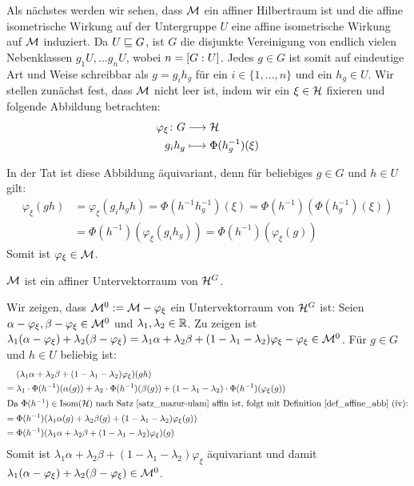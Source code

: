 Als nächstes werden wir sehen, dass $\mathcal{M}$ ein affiner Hilbertraum ist und die affine isometrische Wirkung auf der Untergruppe $U$ eine affine isometrische Wirkung auf $\mathcal{M}$ induziert. Da $U \sqsubseteq G$, ist $G$ die disjunkte Vereinigung von endlich vielen Nebenklassen $g_1U, \dots g_nU$, wobei $n = \left\lbrack G:U\right\rbrack$. Jedes $g \in G$ ist somit auf eindeutige Art und Weise schreibbar als $g = g_i h_g$ für ein $i \in \{1, \dots, n\}$ und ein $h_g \in U$. Wir stellen zunächst fest, dass $\mathcal{M}$ nicht leer ist, indem wir ein $\xi \in \mathcal{H}$ fixieren und folgende Abbildung betrachten:
	\begin{equation}
	\begin{aligned}
	\varphi_\xi\colon G &\longrightarrow \mathcal{H} \\
	g_i h_g &\longmapsto \Phi(h_g^{-1})(\xi)
	\end{aligned}
	\end{equation}	

In der Tat ist diese Abbildung äquivariant, denn für beliebiges $g \in G$ und $h \in U$ gilt:
\begin{equation}
\begin{aligned}
	\varphi_\xi(gh) &= \varphi_\xi(g_i h_g h) = \Phi(h^{-1}h_g^{-1})(\xi) = \Phi(h^{-1}) (\Phi(h_g^{-1})(\xi)) \\
		&= \Phi(h^{-1})(\varphi_\xi(g_i h_g)) = \Phi(h^{-1})(\varphi_\xi(g))
\end{aligned}
\end{equation}
Somit ist $\varphi_\xi \in \mathcal{M}$.

\begin{proposition}
\label{prop_MM0}
	$\mathcal{M}$ ist ein affiner Untervektorraum von $\mathcal{H}^G$.
\end{proposition}

\begin{beweis}
	Wir zeigen, dass $\mathcal{M}^0 := \mathcal{M} - \varphi_\xi$ ein Untervektorraum von $\mathcal{H}^G$ ist:
	Seien $\alpha - \varphi_\xi, \beta - \varphi_\xi \in \mathcal{M}^0$ und $\lambda_1,\lambda_2 \in \mathbb{R}$. Zu zeigen ist $\lambda_1 (\alpha - \varphi_\xi) + \lambda_2 (\beta - \varphi_\xi) = \lambda_1 \alpha + \lambda_2 \beta + (1-\lambda_1-\lambda_2) \varphi_\xi - \varphi_\xi \in \mathcal{M}^0$. Für $g \in G$ und $h \in U$ beliebig ist: 
	\begin{align}
		&(\lambda_1\alpha + \lambda_2 \beta + (1-\lambda_1-\lambda_2) \varphi_\xi)(gh) \\
		=\; &\lambda_1 \cdot \Phi(h^{-1})(\alpha(g)) + \lambda_2 \cdot \Phi(h^{-1})(\beta(g)) + (1-\lambda_1-\lambda_2) \cdot \Phi(h^{-1})(\varphi_\xi(g)) \\
	\intertext{Da $\Phi(h^{-1}) \in \operatorname{Isom}(\mathcal{H})$ nach Satz~\ref{satz_mazur-ulam} affin ist, folgt mit Definition~\ref{def_affine_abb} (iv):}
		=\; &\Phi(h^{-1})(\lambda_1 \alpha(g) + \lambda_2\beta(g) + (1-\lambda_1-\lambda_2) \varphi_\xi(g)) \\
		=\; &\Phi(h^{-1})(\lambda_1\alpha + \lambda_2\beta + (1-\lambda_1-\lambda_2)\varphi_\xi)(g)
	\end{align}
	Somit ist $\lambda_1 \alpha + \lambda_2 \beta + (1-\lambda_1-\lambda_2) \varphi_\xi$ äquivariant und damit $\lambda_1 (\alpha-\varphi_\xi) + \lambda_2(\beta - \varphi_\xi) \in \mathcal{M}^0$.\qedhere
\end{beweis}

